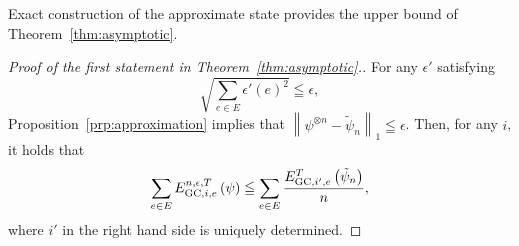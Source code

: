 \documentclass[preprintnumbers,aps,amsmath,amssymb,pra,twocolumn,showpacs,superscriptaddress,floatfix]{revtex4-1}
\theoremstyle{plain}
\theoremstyle{definition}
\theoremstyle{remark}
\begin{document}
Exact construction of the approximate state provides the upper bound of Theorem~\ref{thm:asymptotic}.
\begin{proof}[Proof of the first statement in Theorem~\ref{thm:asymptotic}.]
For any $\epsilon'$ satisfying
\begin{equation}
    \sqrt{\sum_{e\in E}{\epsilon'(e)}^2}\leqq\epsilon,
\end{equation}
Proposition~\ref{prp:approximation} implies that $\left\|\psi^{\otimes n}-\tilde\psi_n\right\| _1\leqq\epsilon$.
Then, for any $i$, it holds that
\begin{equation}
\label{eq:approximate_exact}
    \sum_{e\in E}E_{\textup{GC},i,e}^{n,\epsilon,T}\left(\psi\right) \leqq \sum_{e\in E}\frac{E_{\textup{GC},i',e}^T\left(\tilde\psi_n\right)}{n},
\end{equation}
where $i'$ in the right hand side is uniquely determined.


\end{proof}
\end{document}
